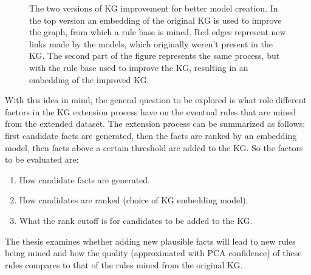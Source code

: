 \begin{figure}[htp]
    \centering
    
    \caption[Figure representing the process.]{The two versions of KG improvement for better model creation. In the top version an embedding of the original KG is used to improve the graph, from which a rule base is mined. Red edges represent new links made by the models, which originally weren't present in the KG. The second part of the figure represents the same process, but with the rule base used to improve the KG, resulting in an embedding of the improved KG.}
    \label{rule_based_and_embedding}
\end{figure}

With this idea in mind, the general question to be explored is what role different factors in the KG extension process have on the eventual rules that are mined from the extended dataset. The extension process can be summarized as follows: first candidate facts are generated, then the facts are ranked by an embedding model, then facts above a certain threshold are added to the KG. So the factors to be evaluated are:
\begin{enumerate}
    \item How candidate facts are generated.
    \item How candidates are ranked (choice of KG embedding model).
    \item What the rank cutoff is for candidates to be added to the KG.
\end{enumerate}

The thesis examines whether adding new plausible facts will lead to new rules being mined and how the quality (approximated with PCA confidence) of these rules compares to that of the rules mined from the original KG.



